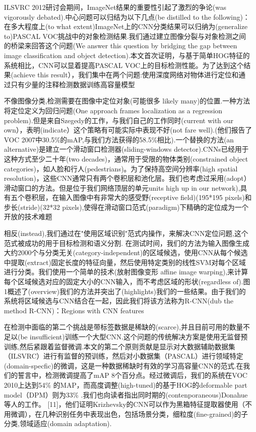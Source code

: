 \documentclass[a4paper,UTF8]{ctexart}
\theoremstyle{definition}
\begin{document}
ILSVRC 2012研讨会期间，ImageNet结果的重要性引起了激烈的争论(was vigorously debated).中心问题可以归结为以下几点(be distilled to the following)：在多大程度上(to what extent)ImageNet上的CNN分类结果可以归纳为(generalize to)PASCAL VOC挑战中的对象检测结果.我们通过建立图像分裂与对象检测之间的桥梁来回答这个问题(We answer this question by bridging the gap between image classification and object detection).本文首次证明，与基于简单HOG特征的系统相比，CNN可以显着提高PASCAL VOC上的目标检测性能。为了达到这个结果(achieve this result），我们集中在两个问题:使用深度网络对物体进行定位和通过只有少量的注释检测数据训练高容量模型

不像图像分类,检测需要在图像中定位对象(可能很多 likely many)的位置.一种方法将定位定义为回归问题(One approach frames localization as a regression problem).但是来自Szegedy的工作，与我们自己的工作同时(current with our own），表明(indicate）这个策略有可能实际中表现不好(not fare well).(他们报告了VOC 2007中30.5\%的mAP,与我们方法获得的58.5\%相比).一个替换的方法(an alternative)是建立一个滑动窗口检测器(sliding-windows detector).CNNs已经用于这种方式至少二十年(two decades)，通常用于受限的物体类别(constrained object categories)，如人脸和行人(pedestrians)。为了保持高空间分辨率(high spatial resolution)，这些CNN通常只有两个卷积层和池化层。我们也考虑过采用(adopt）滑动窗口的方法。但是位于我们网络顶层的单元units high up in our network),具有五个卷积层，在输入图像中有非常大的感受野(receptive field)(195*195 pixels)和步长(stride)(32*32 pixels),使得在滑动窗口范式(paradigm)下精确的定位成为一个开放的技术难题

相反(instead),我们通过在"使用区域识别"范式内操作，来解决CNN定位问题,这个范式被成功的用于目标检测和语义分割.
在测试时间，我们的方法为输入图像生成大约2000个与分类无关(category-independent)的区域候选，使用CNN从每个候选中提取(extract)固定长度的特征向量，然后使用特定类别的线性SVM对每个区域进行分类。我们使用一个简单的技术(放射图像变形 affine image warping),来计算每个区域候选对应的固定大小的CNN输入，而不考虑区域的形状(regardless of).图1概述了(overview)我们的方法并突出了(highlights)我们的一些结果。由于我们的系统将区域候选与CNN结合在一起，因此我们将该方法称为R-CNN(dub the method R-CNN)：Regions with CNN features

在检测中面临的第二个挑战是带标签数据是稀缺的(scarce),并且目前可用的数量不足以(be insufficient)训练一个大型CNN.这个问题的传统解决方案是使用无监督预训练,然后紧跟着监督微调.本文的第二个原则贡献是显示对大数据辅助数据集（ILSVRC）进行有监督的预训练，然后对小数据集（PASCAL）进行领域特定(domain-specfic)的微调，这是一种数据稀缺时有效的学习高容量CNN的范式.在我们的誓言中，检测微调提高了mAP 8个百分点。经过微调后，我们的系统在VOC 2010上达到54\% 的MAP，而高度调整(high-tuned)的基于HOG的deformable part model（DPM）则为33\% .我们也向读者指出同时期的(contenporaneous)Donahue等人的工作。 [11]，他们证明Krizhevsky的CNN可以作为黑箱特征提取器使用（不用微调），在几种识别任务中表现出色，包括场景分类，细粒度(fine-grained)的子分类,领域适应(domain adaptation).
\end{document}
